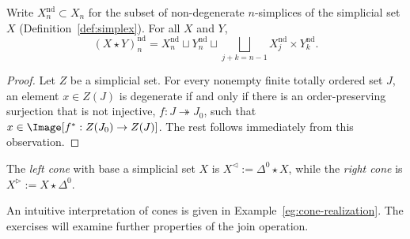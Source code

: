 \begin{proposition}\label{prop:join-nd}
	Write $X_n^{\mathrm{nd}}\subset X_n$ for the subset of non-degenerate
	$n$-simplices of the simplicial set $X$
	(Definition~\ref{def:simplex}). For all $X$ and $Y$,
	\[ (X \star Y)^{\mathrm{nd}}_n = X^{\mathrm{nd}}_n \sqcup Y^{\mathrm{nd}}_n \sqcup \bigsqcup_{j+k=n-1} X^{\mathrm{nd}}_j \times Y^{\mathrm{nd}}_k. \]
\end{proposition}
\begin{proof}
	Let $Z$ be a simplicial set. For every nonempty finite totally ordered set
	$J$, an element $x\in Z(J)$ is degenerate if and only if there is an
	order-preserving surjection that is not injective,
	$f:J\twoheadrightarrow J_0$, such that
	$x\in\Image[f^*:Z(J_0)\to Z(J)]$. The rest follows immediately from this
	observation.
\end{proof}

\begin{definition}\label{def:cone-simplicial}
	The \emph{left cone} with base a simplicial set $X$ is
	$X^{\lhd}:=\Delta^0\star X$, while the \emph{right cone} is
	$X^{\rhd}:=X\star\Delta^0$.
\end{definition}

An intuitive interpretation of cones is given in
Example~\ref{eg:cone-realization}. The exercises will examine further
properties of the join operation.
